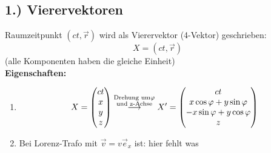 \documentclass[titlepage,12pt,a4paper,ngerman]{report}
\newcommand{\tx}[1]{\textrm{#1}}
\begin{document}
{\subsection{1.) Vierervektoren}
Raumzeitpunkt $ (ct,\vec{r}) $ wird als Vierervektor (4-Vektor) geschrieben:
\begin{equation*}
X = (ct, \vec{r}) \tag{1}
\end{equation*}
(alle Komponenten haben die gleiche Einheit)\\
\textbf{Eigenschaften:}\\
\begin{enumerate}[1)]
	\item $$X = \begin{pmatrix}
	ct\\
	x\\
	y\\
	z
	\end{pmatrix} \buildrel \substack{\tx{Drehung um} \varphi\\ \tx{und z-Achse}} \over \longrightarrow X' = \begin{pmatrix}
	ct\\x \cos \varphi + y \sin \varphi\\
	-x \sin \varphi + y \cos \varphi\\ z
	\end{pmatrix}$$
	\item Bei Lorenz-Trafo mit $ \vec{v} = v \vec{e}_x$ ist:
	hier fehlt was 
	
	
	

\end{enumerate}}
\end{document}
